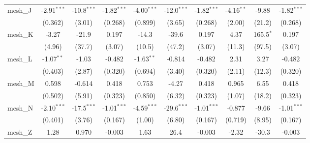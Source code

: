 \begin{tabular}{lccccccccc}
   mesh\_J                                                     & -2.91$^{***}$ & -10.8$^{***}$ & -1.82$^{***}$ & -4.00$^{***}$ & -12.0$^{***}$  & -1.82$^{***}$ & -4.16$^{**}$  & -9.88         & -1.82$^{***}$\\   
                                                               & (0.362)       & (3.01)        & (0.268)       & (0.899)       & (3.65)         & (0.268)       & (2.00)        & (21.2)        & (0.268)\\   
   mesh\_K                                                     & -3.27         & -21.9         & 0.197         & -14.3         & -39.6          & 0.197         & 4.37          & 165.5$^{*}$   & 0.197\\   
                                                               & (4.96)        & (37.7)        & (3.07)        & (10.5)        & (47.2)         & (3.07)        & (11.3)        & (97.5)        & (3.07)\\   
   mesh\_L                                                     & -1.07$^{**}$  & -1.03         & -0.482        & -1.63$^{**}$  & -0.814         & -0.482        & 2.31          & 3.27          & -0.482\\   
                                                               & (0.403)       & (2.87)        & (0.320)       & (0.694)       & (3.40)         & (0.320)       & (2.11)        & (12.3)        & (0.320)\\   
   mesh\_M                                                     & 0.598         & -0.614        & 0.418         & 0.753         & -4.27          & 0.418         & 0.965         & 6.55          & 0.418\\   
                                                               & (0.502)       & (5.91)        & (0.323)       & (0.850)       & (6.32)         & (0.323)       & (1.07)        & (18.2)        & (0.323)\\   
   mesh\_N                                                     & -2.10$^{***}$ & -17.5$^{***}$ & -1.01$^{***}$ & -4.59$^{***}$ & -29.6$^{***}$  & -1.01$^{***}$ & -0.877        & -9.66         & -1.01$^{***}$\\   
                                                               & (0.401)       & (3.76)        & (0.167)       & (1.00)        & (6.80)         & (0.167)       & (0.719)       & (8.95)        & (0.167)\\   
   mesh\_Z                                                     & 1.28          & 0.970         & -0.003        & 1.63          & 26.4           & -0.003        & -2.32         & -30.3         & -0.003\\   

\end{tabular}
